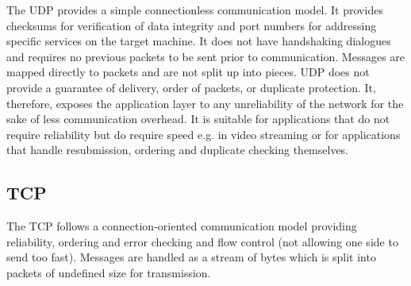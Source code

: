 The \ac{UDP} provides a simple connectionless communication model. It provides checksums for verification of data integrity and port numbers for addressing specific services on the target machine. It does not have handshaking dialogues and requires no previous packets to be sent prior to communication. Messages are mapped directly to packets and are not split up into pieces. \ac{UDP} does not provide a guarantee of delivery, order of packets, or duplicate protection. It, therefore, exposes the application layer to any unreliability of the network for the sake of less communication overhead. It is suitable for applications that do not require reliability but do require speed e.g. in video streaming or for applications that handle resubmission, ordering and duplicate checking themselves.

\subsection{TCP}

The \ac{TCP} follows a connection-oriented communication model providing reliability, ordering and error checking and flow control (not allowing one side to send too fast). Messages are handled as a stream of bytes which is split into packets of undefined size for transmission.

